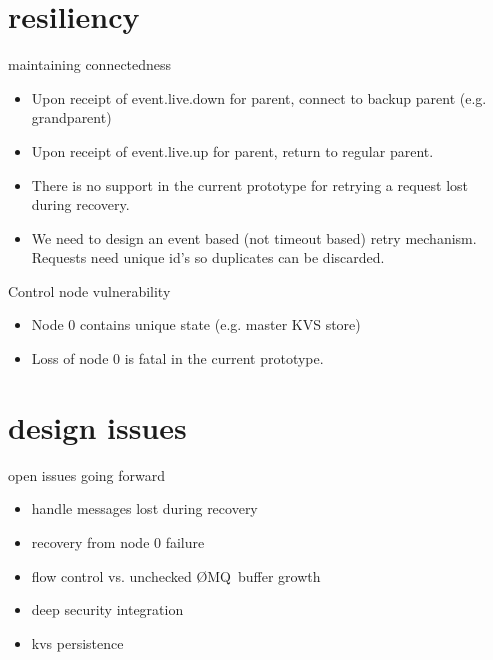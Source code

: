 \documentclass[default,pdf,colorBG,slideColor]{prosper}
\newcommand{\zMQ}{\O{}MQ}
\begin{document}
\part{resiliency}

\begin{slide}{maintaining connectedness}{\small
\begin{itemize}
  \item{Upon receipt of event.live.down for parent, connect to backup parent
	(e.g. grandparent)}
  \item{Upon receipt of event.live.up for parent, return to regular parent.}
  \item{There is no support in the current prototype for retrying a request
        lost during recovery.}
  \item{We need to design an event based (not timeout based) retry mechanism.
        Requests need unique id's so duplicates can be discarded.}
\end{itemize}
}\end{slide}

\begin{slide}{Control node vulnerability}{\small
\begin{itemize}
  \item{Node 0 contains unique state (e.g. master KVS store)}
  \item{Loss of node 0 is fatal in the current prototype.}
\end{itemize}
}\end{slide}

\part{design issues}

\begin{slide}{open issues going forward}{\small
\begin{itemize}
  \item{handle messages lost during recovery}
  \item{recovery from node 0 failure}
  \item{flow control vs. unchecked \zMQ\ buffer growth}
  \item{deep security integration}
  \item{kvs persistence}
\end{itemize}
}\end{slide}
\end{document}
